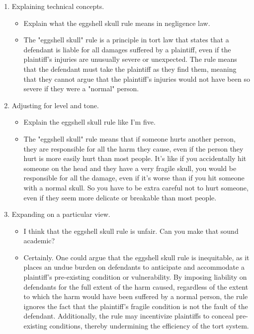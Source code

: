 \begin{enumerate}
  \item Explaining technical concepts. 
  \begin{itemize}
    \item[Q:] Explain what the eggshell skull rule means in negligence law. 
    \item[A:] The "eggshell skull" rule is a principle in tort law that states that a defendant is liable for all damages suffered by a plaintiff, even if the plaintiff's injuries are unusually severe or unexpected. The rule means that the defendant must take the plaintiff as they find them, meaning that they cannot argue that the plaintiff's injuries would not have been so severe if they were a "normal" person.
  \end{itemize}
  \item Adjusting for level and tone. 
  \begin{itemize}
    \item[Q:] Explain the eggshell skull rule like I'm five.
    \item[A:] The "eggshell skull" rule means that if someone hurts another person, they are responsible for all the harm they cause, even if the person they hurt is more easily hurt than most people. It's like if you accidentally hit someone on the head and they have a very fragile skull, you would be responsible for all the damage, even if it's worse than if you hit someone with a normal skull. So you have to be extra careful not to hurt someone, even if they seem more delicate or breakable than most people.
  \end{itemize}
  \item Expanding on a particular view. 
  \begin{itemize}
    \item[Q:] I think that the eggshell skull rule is unfair. Can you make that sound academic?
    \item[A:] Certainly. One could argue that the eggshell skull rule is inequitable, as it places an undue burden on defendants to anticipate and accommodate a plaintiff's pre-existing condition or vulnerability. By imposing liability on defendants for the full extent of the harm caused, regardless of the extent to which the harm would have been suffered by a normal person, the rule ignores the fact that the plaintiff's fragile condition is not the fault of the defendant. Additionally, the rule may incentivize plaintiffs to conceal pre-existing conditions, thereby undermining the efficiency of the tort system.
  \end{itemize} 
\end{enumerate}

